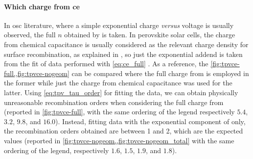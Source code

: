 \paragraph{Which charge from \gls{ce}}
In \gls{osc} literature, where a simple exponential charge \textit{versus} voltage is usually observed, the full $n$ obtained by  is taken.
In perovskite solar cells, the charge from chemical capacitance is usually considered as the relevant charge density for surface recombination, as explained in , so just the exponential addend is taken from the fit of  data performed with \cref{eq:ce_full} \cite{Du2018,Gelmetti2019,Wheeler2017}.
As a reference, the \cref{fig:tpvce-full,,fig:tpvce-nogeom} can be compared where the full charge from  is employed in the former while just the charge from chemical capacitance was used for the latter.
Using \cref{eq:tpv_tau_order} for fitting the data, we can obtain physically unreasonable recombination orders when considering the full charge from  (reported in \cref{fig:tpvce-full}, with the same ordering of the legend respectively $5.4$, $3.2$, $9.8$, and $16.0$).
Instead, fitting data with the exponential component of  only, the recombination orders obtained are between 1 and 2, which are the expected values (reported in \cref{fig:tpvce-nogeom,,fig:tpvce-nogeom_total} with the same ordering of the legend, respectively $1.6$, $1.5$, $1.9$, and $1.8$).

